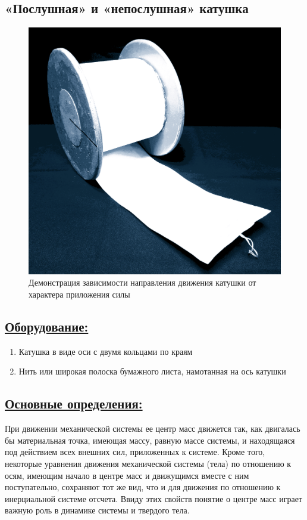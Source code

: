 \documentclass[14pt,a4paper,oneside]{extarticle}	%
\begin{document}

\begin{center}
	\subsection*{«Послушная» и  «непослушная» катушка}
\end{center}

\begin{figure}[H] 
	\centering 	
	\includegraphics[width=0.6\linewidth]{roll-1.png}
	\caption{Демонстрация зависимости направления движения катушки от характера приложения силы}
	\label{roll-1}
\end{figure}

\subsection*{\underline{Оборудование:}}

\begin{enumerate}
	\item Катушка в виде оси с двумя кольцами по краям
	\item Нить или широкая полоска бумажного листа, намотанная на ось катушки
\end{enumerate}

\newpage
\subsection*{\underline{Основные определения:}}

При движении механической системы ее центр масс движется так, как двигалась бы материальная точка, имеющая массу, равную массе системы, и находящаяся под действием всех внешних сил, приложенных к системе. 
Кроме того, некоторые уравнения движения механической системы (тела) по отношению к осям, имеющим начало в центре масс и движущимся вместе с ним поступательно, сохраняют тот же вид, что и для движения по отношению к инерциальной системе отсчета.
Ввиду этих свойств понятие о центре масс играет важную роль в динамике системы и твердого тела.
\end{document}
